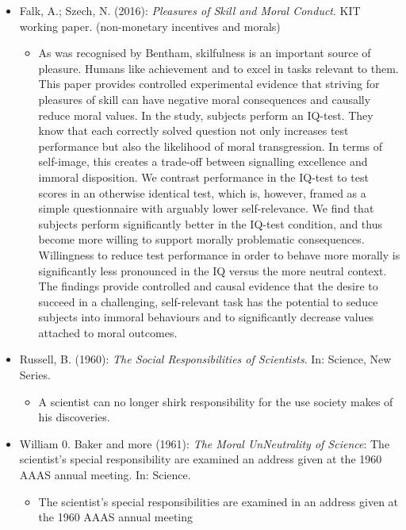 \begin{itemize}
	\item Falk, A.; Szech, N. (2016): \textit{Pleasures of Skill and Moral Conduct}. KIT working paper. (non-monetary incentives and morals)
		\begin{itemize}
			\item As was recognised by Bentham, skilfulness is an important source of pleasure. Humans like achievement and to excel in tasks relevant to them. This paper provides controlled experimental evidence that striving for pleasures of skill can have negative moral consequences and causally reduce moral values. In the study, subjects perform an IQ-test. They know that each correctly solved question not only increases test performance but also the likelihood of moral transgression. In terms of self-image, this creates a trade-off between signalling excellence and immoral disposition. We contrast performance in the IQ-test to test scores in an otherwise identical test, which is, however, framed as a simple questionnaire with arguably lower self-relevance. We find that subjects perform significantly better in the IQ-test condition, and thus become more willing to support morally problematic consequences. Willingness to reduce test performance in order to behave more morally is significantly less pronounced in the IQ versus the more neutral context. The findings provide controlled and causal evidence that the desire to succeed in a challenging, self-relevant task has the potential to seduce subjects into immoral behaviours and to significantly decrease values attached to moral outcomes.
		\end{itemize}
	\item Russell, B. (1960): \textit{The Social Responsibilities of Scientists}. In: Science, New Series.
		\begin{itemize}
			\item A scientist can no longer shirk responsibility for the use society makes of his discoveries.
		\end{itemize}
	\item William 0. Baker and more (1961): \textit{The Moral UnNeutrality of Science}: The scientist's special responsibility are examined an address given at the 1960 AAAS annual meeting. In: Science.
		\begin{itemize}
			\item The scientist's special responsibilities are examined in an address given at the 1960 AAAS annual meeting
		\end{itemize}
\end{itemize}


\newpage